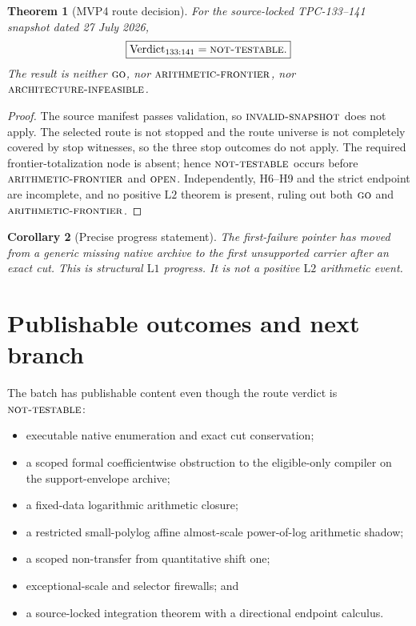 \documentclass[11pt]{article}
\newtheorem{theorem}{Theorem}[section]
\newtheorem{corollary}[theorem]{Corollary}
\theoremstyle{definition}
\theoremstyle{remark}
\newcommand{\GO}{\textnormal{\textsc{go}}}
\newcommand{\AINF}{\textnormal{\textsc{architecture-infeasible}}}
\newcommand{\NT}{\textnormal{\textsc{not-testable}}}
\newcommand{\AF}{\textnormal{\textsc{arithmetic-frontier}}}
\newcommand{\OPEN}{\textnormal{\textsc{open}}}
\newcommand{\INVALID}{\textnormal{\textsc{invalid-snapshot}}}
\newcommand{\Lone}{\mathrm{L1}}
\newcommand{\Ltwo}{\mathrm{L2}}
\begin{document}
\begin{theorem}[MVP4 route decision]
\label{thm:decision}
For the source-locked TPC-133--141 snapshot dated 27 July 2026,
\[
 \boxed{\operatorname{Verdict}_{133:141}=\NT.}
\]
The result is neither \(\GO\), nor \(\AF\), nor \(\AINF\).
\end{theorem}

\begin{proof}
The source manifest passes validation, so \(\INVALID\) does not
apply.  The selected route is not stopped and the route universe is
not completely covered by stop witnesses, so the three stop outcomes
do not apply.  The required frontier-totalization node is absent;
hence \(\NT\) occurs before \(\AF\) and \(\OPEN\).  Independently,
H6--H9 and the strict endpoint are incomplete, and no positive
\(\Ltwo\) theorem is present, ruling out both \(\GO\) and \(\AF\).
\end{proof}

\begin{corollary}[Precise progress statement]
The first-failure pointer has moved from a generic missing native
archive to the first unsupported carrier after an exact cut.  This is
structural \(\Lone\) progress.  It is not a positive \(\Ltwo\)
arithmetic event.
\end{corollary}

\section{Publishable outcomes and next branch}

The batch has publishable content even though the route verdict is
\(\NT\):
\begin{itemize}[leftmargin=2em]
\item executable native enumeration and exact cut conservation;
\item a scoped formal coefficientwise obstruction to the eligible-only
  compiler on the support-envelope archive;
\item a fixed-data logarithmic arithmetic closure;
\item a restricted small-polylog affine almost-scale power-of-log
  arithmetic shadow;
\item a scoped non-transfer from quantitative shift one;
\item exceptional-scale and selector firewalls; and
\item a source-locked integration theorem with a directional
  endpoint calculus.
\end{itemize}
\end{document}
